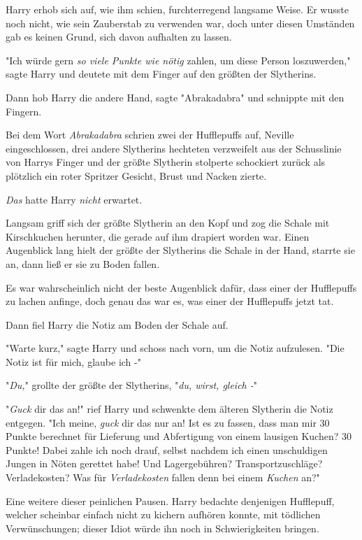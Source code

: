 {Harry erhob sich auf, wie ihm schien, furchterregend langsame Weise. Er wusste noch nicht, wie sein Zauberstab zu verwenden war, doch unter diesen Umständen gab es keinen Grund, sich davon aufhalten zu lassen.

"Ich würde gern \emph{so viele Punkte wie nötig} zahlen, um diese Person loszuwerden," sagte Harry und deutete mit dem Finger auf den größten der Slytherins.

Dann hob Harry die andere Hand, sagte "Abrakadabra" und schnippte mit den Fingern.

Bei dem Wort \emph{Abrakadabra} schrien zwei der Hufflepuffs auf, Neville eingeschlossen, drei andere Slytherins hechteten verzweifelt aus der Schusslinie von Harrys Finger und der größte Slytherin stolperte schockiert zurück als plötzlich ein roter Spritzer Gesicht, Brust und Nacken zierte.

\emph{Das} hatte Harry \emph{nicht} erwartet.

Langsam griff sich der größte Slytherin an den Kopf und zog die Schale mit Kirschkuchen herunter, die gerade auf ihm drapiert worden war. Einen Augenblick lang hielt der größte der Slytherins die Schale in der Hand, starrte sie an, dann ließ er sie zu Boden fallen.

Es war wahrscheinlich nicht der beste Augenblick dafür, dass einer der Hufflepuffs zu lachen anfinge, doch genau das war es, was einer der Hufflepuffs jetzt tat.

Dann fiel Harry die Notiz am Boden der Schale auf.

"Warte kurz," sagte Harry und schoss nach vorn, um die Notiz aufzulesen. "Die Notiz ist für mich, glaube ich -"

"\emph{Du,}" grollte der größte der Slytherins, "\emph{du, wirst, gleich -}"

"\emph{Guck} dir das an!" rief Harry und schwenkte dem älteren Slytherin die Notiz entgegen. "Ich meine, \emph{guck} dir das nur an! Ist es zu fassen, dass man mir 30 Punkte berechnet für Lieferung und Abfertigung von einem lausigen Kuchen? 30 Punkte! Dabei zahle ich noch drauf, selbst nachdem ich einen unschuldigen Jungen in Nöten gerettet habe! Und Lagergebühren? Transportzuschläge? Verladekosten? Was für \emph{Verladekosten} fallen denn bei einem \emph{Kuchen} an?"

Eine weitere dieser peinlichen Pausen. Harry bedachte denjenigen Hufflepuff, welcher scheinbar einfach nicht zu kichern aufhören konnte, mit tödlichen Verwünschungen; dieser Idiot würde ihn noch in Schwierigkeiten bringen.

}
